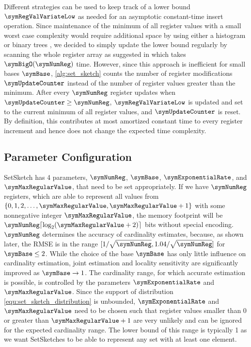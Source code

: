 \documentclass[sigconf, nonacm]{acmart}
\begin{document}
Different strategies can be used to keep track of a lower bound $\symRegValVariateLow$ as needed for an asymptotic constant-time insert operation. Since maintenance of the minimum of all register values with a small worst case complexity would require additional space by using either a histogram \cite{Ertl2017} or binary trees \cite{Ertl2018, Ertl2020}, we decided to simply update the lower bound regularly by scanning the whole register array as suggested in \cite{Reviriego2020} which takes $\symBigO(\symNumReg)$ time. However, since this approach is inefficient for small bases $\symBase$, \cref{alg:set_sketch} counts the number of register modifications $\symUpdateCounter$ instead of the number of register values greater than the minimum. After every $\symNumReg$ register updates when $\symUpdateCounter\geq \symNumReg$, $\symRegValVariateLow$ is updated and set to the current minimum of all register values, and $\symUpdateCounter$ is reset. By definition, this contributes at most amortized constant time to every register increment and hence does not change the expected time complexity.

\subsection{Parameter Configuration}
\label{sec:parameter_config}
SetSketch has 4 parameters, $\symNumReg$, $\symBase$, $\symExponentialRate$, and $\symMaxRegularValue$, that need to be set appropriately. If we have $\symNumReg$ registers, which are able to represent all values from $\lbrace 0,1,2,\ldots, \symMaxRegularValue,\symMaxRegularValue+1\rbrace$ with some nonnegative integer $\symMaxRegularValue$, the memory footprint will be $\symNumReg\lceil\log_2(\symMaxRegularValue+2)\rceil$ bits without special encoding. 
$\symNumReg$ determines the accuracy of cardinality estimates, because, as shown later, the \ac{RMSE} is in the range $[1/\sqrt{\symNumReg}, 1.04/\sqrt{\symNumReg}]$ for $\symBase\leq 2$. While the choice of the base $\symBase$ has only little influence on cardinality estimation, joint estimation and locality sensitivity are significantly improved as $\symBase\rightarrow 1$. 
The cardinality range, for which accurate estimation is possible, is controlled by the parameters $\symExponentialRate$ and $\symMaxRegularValue$.
Since the support of distribution \eqref{equ:set_sketch_distribution} is unbounded, $\symExponentialRate$ and $\symMaxRegularValue$ need to be chosen such that register values smaller than 0 or greater than $\symMaxRegularValue+1$ are very unlikely and can be ignored for the expected cardinality range. The lower bound of this range is typically 1 as we want SetSketches to be able to represent any set with at least one element.
\end{document}
